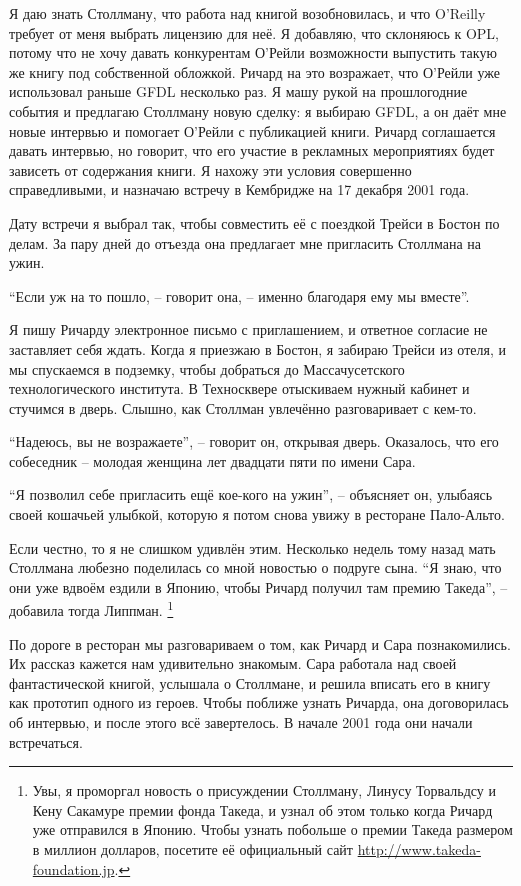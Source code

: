 Я даю знать Столлману, что работа над книгой возобновилась, и что O'Reilly требует от меня выбрать лицензию для неё. Я добавляю, что склоняюсь к OPL, потому что не хочу давать конкурентам О'Рейли возможности выпустить такую же книгу под собственной обложкой. Ричард на это возражает, что О'Рейли уже использовал раньше GFDL несколько раз. Я машу рукой на прошлогодние события и предлагаю Столлману новую сделку: я выбираю GFDL, а он даёт мне новые интервью и помогает О'Рейли с публикацией книги. Ричард соглашается давать интервью, но говорит, что его участие в рекламных мероприятиях будет зависеть от содержания книги. Я нахожу эти условия совершенно справедливыми, и назначаю встречу в Кембридже на 17 декабря 2001 года.

Дату встречи я выбрал так, чтобы совместить её с поездкой Трейси в Бостон по делам. За пару дней до отъезда она предлагает мне пригласить Столлмана на ужин.

\enquote{Если уж на то пошло, -- говорит она, -- именно благодаря ему мы вместе}.

Я пишу Ричарду электронное письмо с приглашением, и ответное согласие не заставляет себя ждать. Когда я приезжаю в Бостон, я забираю Трейси из отеля, и мы спускаемся в подземку, чтобы добраться до Массачусетского технологического института. В Техносквере отыскиваем нужный кабинет и стучимся в дверь. Слышно, как Столлман увлечённо разговаривает с кем-то.

\enquote{Надеюсь, вы не возражаете}, -- говорит он, открывая дверь. Оказалось, что его собеседник -- молодая женщина лет двадцати пяти по имени Сара.

\enquote{Я позволил себе пригласить ещё кое-кого на ужин}, -- объясняет он, улыбаясь своей кошачьей улыбкой, которую я потом снова увижу в ресторане Пало-Альто.

Если честно, то я не слишком удивлён этим. Несколько недель тому назад мать Столлмана любезно поделилась со мной новостью о подруге сына. \enquote{Я знаю, что они уже вдвоём ездили в Японию, чтобы Ричард получил там премию Такеда}, -- добавила тогда Липпман. \footnote{Увы, я проморгал новость о присуждении Столлману, Линусу Торвальдсу и Кену Сакамуре премии фонда Такеда, и узнал об этом только когда Ричард уже отправился в Японию. Чтобы узнать побольше о премии Такеда размером в миллион долларов, посетите её официальный сайт \url{http://www.takeda-foundation.jp}.}

По дороге в ресторан мы разговариваем о том, как Ричард и Сара познакомились. Их рассказ кажется нам удивительно знакомым. Сара работала над своей фантастической книгой, услышала о Столлмане, и решила вписать его в книгу как прототип одного из героев. Чтобы поближе узнать Ричарда, она договорилась об интервью, и после этого всё завертелось. В начале 2001 года они начали встречаться.

